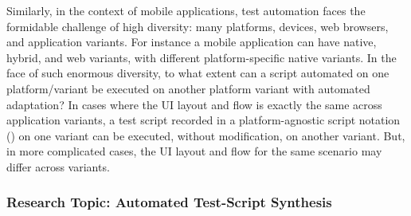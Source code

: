 Similarly, in the context of mobile applications, test automation faces the
formidable challenge of high diversity: many platforms, devices, web browsers,
and application variants. For instance a mobile application can have native,
hybrid, and web variants, with different platform-specific native variants. In
the face of such enormous diversity, to what extent can a script automated on
one platform/variant be executed on another platform variant with automated
adaptation?  In cases where the UI layout and flow is exactly the same across
application variants, a test script recorded in a platform-agnostic script
notation (\eg \cite{PerfectoScriptOnce}) on one variant can be executed, without
modification, on another variant.  But, in more complicated cases, the UI layout
and flow for the same scenario may differ across variants.




\subsubsection*{Research Topic: Automated Test-Script Synthesis}

